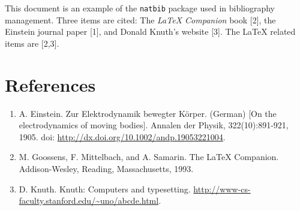 \documentclass{article}
\begin{document}
This document is an example of the \texttt{natbib} package used in bibliography management. Three items are cited: The \textit{LaTeX Companion} book [2], the Einstein journal paper [1], and Donald Knuth's website [3]. The \LaTeX{} related items are [2,3].


\section*{References}
\begin{enumerate}
  \item A. Einstein. Zur Elektrodynamik bewegter Körper. (German) [On the electrodynamics of moving bodies]. Annalen der Physik, 322(10):891-921, 1905. doi: \url{http://dx.doi.org/10.1002/andp.19053221004}.
  
  \item M. Goossens, F. Mittelbach, and A. Samarin. The \LaTeX{} Companion. Addison-Wesley, Reading, Massachusetts, 1993.
  
  \item D. Knuth. Knuth: Computers and typesetting. \url{http://www-cs-faculty.stanford.edu/~uno/abcde.html}.
\end{enumerate}
\end{document}
